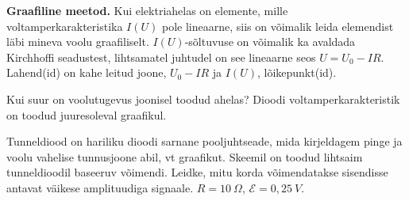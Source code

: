 \documentclass[a4paper,11pt,twocolumn]{article}
\begin{document}
\textbf{Graafiline meetod.} Kui elektriahelas on elemente, mille voltamperkarakteristika \( I(U) \) pole lineaarne, siis on võimalik leida elemendist läbi mineva voolu graafiliselt. \( I(U) \)-sõltuvuse on võimalik ka avaldada Kirchhoffi seadustest, lihtsamatel juhtudel on see lineaarne seos \( U=U_0-IR \). Lahend(id) on kahe leitud joone, \( U_0-IR \) ja \( I(U) \), lõikepunkt(id).

\begin{question}[ela10][8.4cm]
	Kui suur on voolutugevus joonisel toodud ahelas? Dioodi voltamperkarakteristik on toodud juuresoleval graafikul.
\end{question}
\begin{question}[E-S 2003, P4][ela11][\columnwidth]
	Tunneldiood on hariliku dioodi sarnane pooljuhtseade, mida kirjeldagem pinge ja voolu vahelise tunnusjoone abil, vt graafikut. Skeemil on toodud lihtsaim tunneldioodil baseeruv võimendi. Leidke,
	mitu korda võimendatakse sisendisse antavat väikese amplituudiga
	signaale. \( R=10\ \Omega\), \( \mathcal{E}=0,25\ V \).
\end{question}
\end{document}
